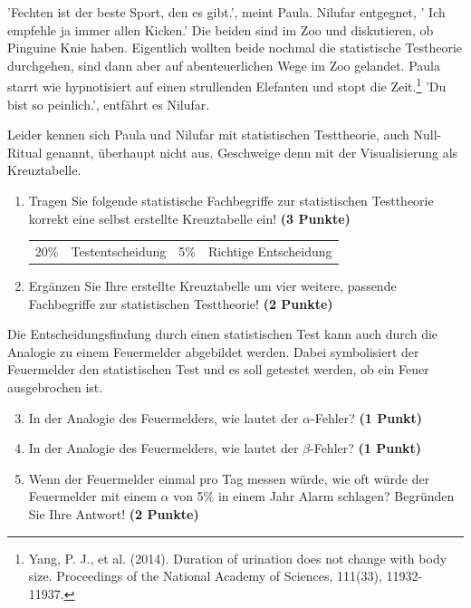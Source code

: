 \documentclass[a4paper, 9pt]{scrartcl}\usepackage[]{graphicx}\usepackage[]{xcolor}
\begin{document}
'Fechten ist der beste Sport, den es gibt.', meint Paula. Nilufar entgegnet, ' Ich empfehle ja immer allen Kicken.' Die beiden sind im Zoo und diskutieren, ob Pinguine Knie haben. Eigentlich wollten beide nochmal die statistische Testheorie durchgehen, sind dann aber auf abenteuerlichen Wege im Zoo gelandet. Paula starrt wie hypnotisiert auf einen strullenden Elefanten und stopt die Zeit.\footnote{Yang, P. J., et al. (2014). Duration of urination does not change with body size. Proceedings of the National Academy of Sciences, 111(33), 11932-11937.} 'Du bist so peinlich.', entfährt es Nilufar.

\vspace{1ex}

Leider kennen sich Paula und Nilufar mit statistischen Testtheorie, auch Null-Ritual genannt, überhaupt nicht aus. Geschweige denn mit der Visualisierung als Kreuztabelle.  

\begin{enumerate}
\item Tragen Sie folgende statistische Fachbegriffe zur statistischen Testtheorie korrekt eine selbst erstellte Kreuztabelle ein! \textbf{(3 Punkte)}
  \begin{center}
  \begin{tabular}{cccc}
  20\% & Testentscheidung & 5\% & Richtige Entscheidung \\
  \end{tabular}
  \end{center}
\item Ergänzen Sie Ihre erstellte Kreuztabelle um vier weitere, passende Fachbegriffe zur statistischen Testtheorie! \textbf{(2 Punkte)}
\end{enumerate}

Die Entscheidungsfindung durch einen statistischen Test kann auch durch die Analogie zu einem Feuermelder abgebildet werden. Dabei symbolisiert der Feuermelder den statistischen Test und es soll getestet werden, ob ein Feuer ausgebrochen ist.

\begin{enumerate}
  \setcounter{enumi}{2}    
\item In der Analogie des Feuermelders, wie lautet der $\alpha$-Fehler? \textbf{(1 Punkt)}
\item In der Analogie des Feuermelders, wie lautet der $\beta$-Fehler? \textbf{(1 Punkt)}
\item Wenn der Feuermelder einmal pro Tag messen würde, wie oft würde der Feuermelder mit einem $\alpha$ von 5\% in einem Jahr Alarm schlagen? Begründen Sie Ihre Antwort! \textbf{(2 Punkte)}
\end{enumerate}
\end{document}
